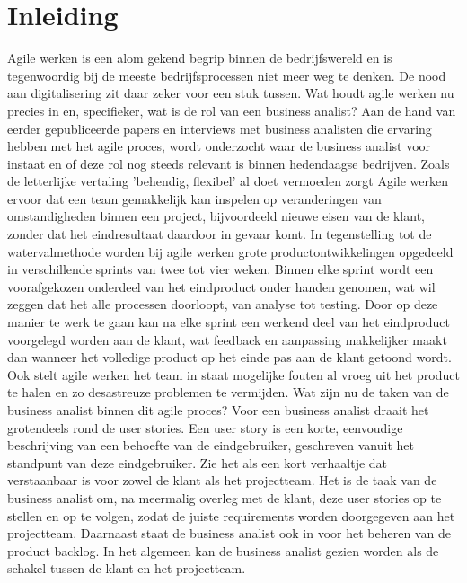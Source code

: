 \documentclass{hogent-article}
\affiliation{
	\textsuperscript{1} \href{mailto:bram.vanoverbeke@student.hogent.be}{bram.vanoverbeke@student.hogent.be}
	\textsuperscript{2}
	\href{mailto:stef.verlinde@student.hogent.be}{	stef.verlinde@student.hogent.be}
}
\affiliation{
	\textsuperscript{3}
	\href{mailto:jordy.detier@student.hogent.be}{jordy.detier@student.hogent.be}
	\textsuperscript{4} \href{mailto:joppe.minjauw@student.hogent.be}{joppe.minjauw@student.hogent.be}
}
\begin{document}
	
	\flushbottom %
	\maketitle %
	\tableofcontents %
	\thispagestyle{empty} %
	
	
	\section{Inleiding}
	
	
	Agile werken is een alom gekend begrip binnen de bedrijfswereld en is tegenwoordig bij de meeste bedrijfsprocessen niet meer weg te denken. De nood aan digitalisering zit daar zeker voor een stuk tussen. Wat houdt agile werken nu precies in en, specifieker, wat is de rol van een business analist?
	Aan de hand van eerder gepubliceerde papers en interviews met business analisten die ervaring hebben met het agile proces, wordt onderzocht waar de business analist voor instaat en of deze rol nog steeds relevant is binnen hedendaagse bedrijven.
	\newline
	\newline Zoals de letterlijke vertaling 'behendig, flexibel' al doet vermoeden zorgt Agile werken ervoor dat een team gemakkelijk kan inspelen op veranderingen van omstandigheden binnen een project, bijvoordeeld nieuwe eisen van de klant, zonder dat het eindresultaat daardoor in gevaar komt. In tegenstelling tot de watervalmethode worden bij agile werken grote productontwikkelingen opgedeeld in verschillende sprints van twee tot vier weken. Binnen elke sprint wordt een voorafgekozen onderdeel van het eindproduct onder handen genomen, wat wil zeggen dat het alle processen doorloopt, van analyse tot testing. Door op deze manier te werk te gaan kan na elke sprint een werkend deel van het eindproduct voorgelegd worden aan de klant, wat feedback en aanpassing makkelijker maakt dan wanneer het volledige product op het einde pas aan de klant getoond wordt. Ook stelt agile werken het team in staat mogelijke fouten al vroeg uit het product te halen en zo desastreuze problemen te vermijden.\newline
	\newline Wat zijn nu de taken van de business analist binnen dit agile proces? Voor een business analist draait het grotendeels rond de user stories. Een user story is een korte, eenvoudige beschrijving van een behoefte van de eindgebruiker, geschreven vanuit het standpunt van deze eindgebruiker. Zie het als een kort verhaaltje dat verstaanbaar is voor zowel de klant als het projectteam. Het is de taak van de business analist om, na meermalig overleg met de klant, deze user stories op te stellen en op te volgen, zodat de juiste requirements worden doorgegeven aan het projectteam. Daarnaast staat de business analist ook in voor het beheren van de product backlog. In het algemeen kan de business analist gezien worden als de schakel tussen de klant en het projectteam.
\end{document}
